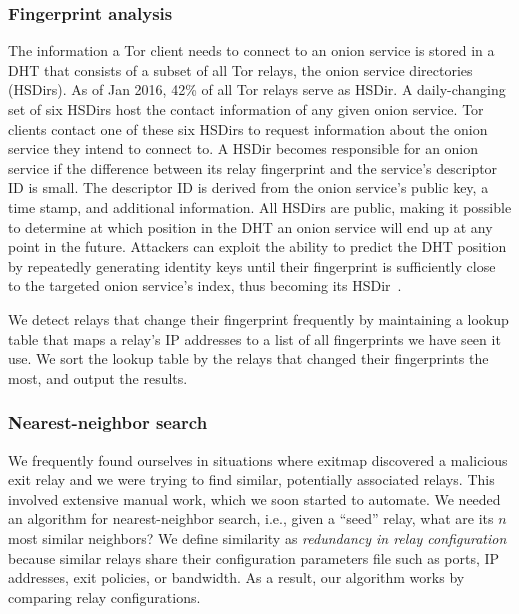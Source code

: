 \subsubsection{Fingerprint analysis}
\label{sec:fingerprint-analysis}
The information a Tor client needs to connect to an onion service is stored in a
DHT that consists of a subset of all Tor relays, the onion service directories
(HSDirs).  As of Jan 2016, 42\% of all Tor relays serve as HSDir.  A
daily-changing set of six HSDirs host the contact information of any given
onion service.  Tor clients contact one of these six HSDirs to request
information about the onion service they intend to connect to.  A HSDir becomes
responsible for an onion service if the difference between its relay fingerprint
and the service's descriptor ID is small.  The descriptor ID is derived from the
onion service's public key, a time stamp, and additional information.
All HSDirs are public, making it possible to determine at which position in the
DHT an onion service will end up at any point in the future.  Attackers can
exploit the ability to predict the DHT position by repeatedly generating
identity keys until their fingerprint is sufficiently close to the targeted
onion service's index, thus becoming its HSDir~\cite{Biryukov2013a}.

We detect relays that change their fingerprint frequently by maintaining a
lookup table that maps a relay's IP addresses to a list of all fingerprints we
have seen it use.  We sort the lookup table by the relays that changed their
fingerprints the most, and output the results.

\subsubsection{Nearest-neighbor search}
\label{sec:nearest-neighbor}
We frequently found ourselves in situations where exitmap discovered a malicious
exit relay and we were trying to find similar, potentially associated relays.
This involved extensive manual work, which we soon started to automate.  We
needed an algorithm for nearest-neighbor search, i.e., given a ``seed'' relay,
what are its $n$ most similar neighbors?  We define similarity as
\emph{redundancy in relay configuration} because similar relays share their
configuration parameters file such as ports, IP addresses, exit policies, or
bandwidth.  As a result, our algorithm works by comparing relay configurations.

